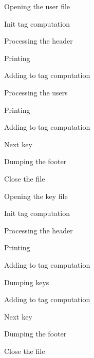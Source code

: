  
\begin{DoxyEnumerate}
\item Opening the user file


\item Init tag computation 


\item Processing the header  
\begin{DoxyItemize}
\item Printing 


\item Adding to tag computation 


\end{DoxyItemize}


\item Processing the users  
\begin{DoxyItemize}
\item Printing 


\item Adding to tag computation 


\item Next key 


\item Dumping the footer


\item Close the file


\item Opening the key file


\item Init tag computation 


\item Processing the header  
\begin{DoxyItemize}
\item Printing 


\item Adding to tag computation 


\end{DoxyItemize}


\item Dumping keys


\item Adding to tag computation 


\item Next key 


\item Dumping the footer


\item Close the file


\end{DoxyItemize}
\end{DoxyEnumerate}

